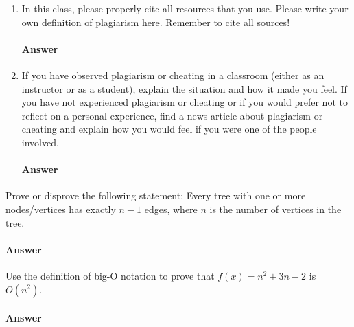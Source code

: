 \documentclass{article}
\begin{document}
\collab{\todo{}}

\begin{enumerate}

    \item In this class, please properly cite all resources that you use. Please
          write your own definition of plagiarism here.  Remember to cite all
          sources!
          
          \paragraph{Answer}
          \todo{}
          
    \item If you have observed plagiarism or cheating in a classroom (either as
          an instructor or as a student), explain the situation and how it made
          you feel.  If you have not experienced plagiarism or cheating or if you
          would prefer not to reflect on a personal experience, find a news
          article about plagiarism or cheating and explain how you would feel if
          you were one of the people involved.
          
          \paragraph{Answer}
          \todo{}
\end{enumerate}

\collab{\todo{}}

Prove or disprove the following statement: Every tree with one or more
nodes/vertices has exactly $n-1$ edges, where $n$ is the number of vertices in
the tree.

\paragraph{Answer}

\todo{}


\collab{\todo{}}
Use the definition of big-O notation to prove that $f(x)=n^2 + 3n -2$ is
$O(n^2)$.

\paragraph{Answer}
\end{document}
